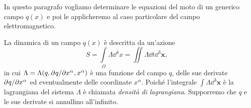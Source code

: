 In questo paragrafo vogliamo determinare le equazioni del moto di un generico
campo $q(x)$ e poi le applicheremo al caso particolare del campo
elettromagnetico.

La dinamica di un campo $q(x)$ è descritta da un'azione
\begin{equation}
  \label{eq:azione-campo}
  S = \int\limits_{\Omega} \Lambda\dd^{4} x = \iint \Lambda \dd t\dd^{3} \bm{x},
\end{equation}
in cui $\Lambda = \Lambda(q, \partial^{} q / \partial {x^{\alpha}}^{}, x^{\alpha})$ è una
funzione del campo $q$, delle sue derivate $\partial^{} q / \partial {x^{\alpha}}^{}$ ed
eventualmente delle coordinate $x^{\alpha}$.  Poiché l'integrale
$\int \Lambda\dd^{3} \bm{x}$ è la lagrangiana del sistema $\Lambda$ è chiamata
\emph{densità di lagrangiana}.  Supporremo che $q$
e le sue derivate si annullino all'infinito.

